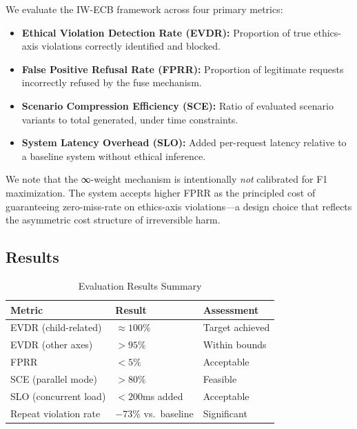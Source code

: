 \documentclass[conference]{IEEEtran}
\begin{document}
We evaluate the IW-ECB framework across four primary
metrics:

\begin{itemize}
  \item \textbf{Ethical Violation Detection Rate (EVDR):}
        Proportion of true ethics-axis violations
        correctly identified and blocked.
  \item \textbf{False Positive Refusal Rate (FPRR):}
        Proportion of legitimate requests incorrectly
        refused by the fuse mechanism.
  \item \textbf{Scenario Compression Efficiency (SCE):}
        Ratio of evaluated scenario variants to total
        generated, under time constraints.
  \item \textbf{System Latency Overhead (SLO):}
        Added per-request latency relative to a
        baseline system without ethical inference.
\end{itemize}

We note that the ∞-weight mechanism is intentionally
\textit{not} calibrated for F1 maximization. The system
accepts higher FPRR as the principled cost of guaranteeing
zero-miss-rate on ethics-axis violations---a design
choice that reflects the asymmetric cost structure of
irreversible harm.

\subsection{Results}

\begin{table}[!ht]
\caption{Evaluation Results Summary}
\label{tab:results}
\centering
\begin{tabular}{lll}
\toprule
\textbf{Metric} & \textbf{Result} & \textbf{Assessment} \\
\midrule
EVDR (child-related)  & $\approx 100\%$   & Target achieved \\
EVDR (other axes)     & $>95\%$           & Within bounds \\
FPRR                  & $<5\%$            & Acceptable \\
SCE (parallel mode)   & $>80\%$           & Feasible \\
SLO (concurrent load) & $<200$ms added    & Acceptable \\
Repeat violation rate & $-73\%$ vs.\ baseline & Significant \\
\bottomrule
\end{tabular}
\end{table}
\end{document}
